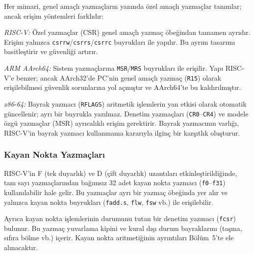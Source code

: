 \begin{karsilastirma}
Her mimari, genel amaçlı yazmaçların yanında özel amaçlı yazmaçlar tanımlar; ancak erişim yöntemleri farklıdır:

\emph{RISC-V:} Özel yazmaçlar (CSR) genel amaçlı yazmaç öbeğindan tamamen ayrıdır. Erişim yalnızca \texttt{csrrw}/\texttt{csrrs}/\texttt{csrrc} buyrukları ile yapılır. Bu ayrım tasarımı basitleştirir ve güvenliği artırır.

\emph{ARM AArch64:} Sistem yazmaçlarına \texttt{MSR}/\texttt{MRS} buyrukları ile erişilir. Yapı RISC-V'e benzer; ancak AArch32'de PC'nin genel amaçlı yazmaç (\texttt{R15}) olarak erişilebilmesi güvenlik sorunlarına yol açmıştır ve AArch64'te bu kaldırılmıştır.

\emph{x86-64:} Bayrak yazmacı (\texttt{RFLAGS}) aritmetik işlemlerin yan etkisi olarak otomatik güncellenir; ayrı bir buyrukla yazılmaz. Denetim yazmaçları (\texttt{CR0}--\texttt{CR4}) ve modele özgü yazmaçlar (MSR) ayrıcalıklı erişim gerektirir. Bayrak yazmacının varlığı, RISC-V'in bayrak yazmacı kullanmama kararıyla ilginç bir karşıtlık oluşturur.
\end{karsilastirma}

\subsubsection{Kayan Nokta Yazmaçları}

RISC-V'in F (tek duyarlık) ve D (çift duyarlık) uzantıları etkinleştirildiğinde, tam sayı yazmaçlarından bağımsız 32 adet kayan nokta yazmacı (\texttt{f0}--\texttt{f31}) kullanılabilir hale gelir. Bu yazmaçlar ayrı bir yazmaç öbeğinda yer alır ve yalnızca kayan nokta buyrukları (\texttt{fadd.s}, \texttt{flw}, \texttt{fsw} vb.) ile erişilebilir.

Ayrıca kayan nokta işlemlerinin durumunu tutan bir denetim yazmacı (\texttt{fcsr}) bulunur. Bu yazmaç yuvarlama kipini ve kural dışı durum bayraklarını (taşma, sıfıra bölme vb.) içerir. Kayan nokta aritmetiğinin ayrıntıları Bölüm~5'te ele alınacaktır.

